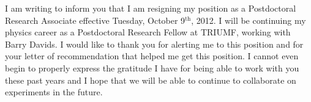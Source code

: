 I am writing to inform you that I am resigning my position as a Postdoctoral Research Associate effective Tuesday, October 9$^{\textrm{th}}$, 2012.
I will be continuing my physics career as a Postdoctoral Research Fellow at TRIUMF, working with Barry Davids.
I would like to thank you for alerting me to this position and for your letter of recommendation %
that helped me get this position.  I cannot even begin to properly express the gratitude I have for being able to work with you these past years and I hope that we will be able to continue to collaborate on experiments in the future.